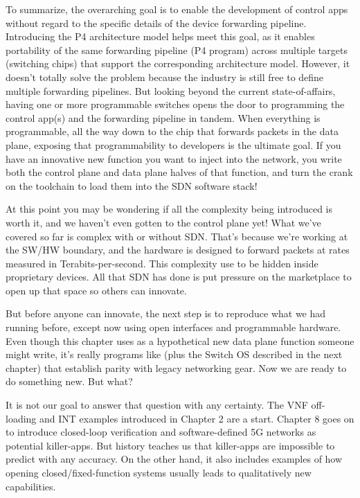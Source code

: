 \documentclass[letterpaper,11pt,english]{sphinxmanual}
\begin{document}
To summarize, the overarching goal is to enable the development of
control apps without regard to the specific details of the device
forwarding pipeline. Introducing the P4 architecture model helps meet
this goal, as it enables portability of the same forwarding pipeline
(P4 program) across multiple targets (switching chips) that support
the corresponding architecture model. However, it doesn’t totally
solve the problem because the industry is still free to define
multiple forwarding pipelines. But looking beyond the current
state-of-affairs, having one or more programmable switches opens the
door to programming the control app(s) and the forwarding pipeline in
tandem. When everything is programmable, all the way down to the chip
that forwards packets in the data plane, exposing that programmability
to developers is the ultimate goal. If you have an innovative new
function you want to inject into the network, you write both the
control plane and data plane halves of that function, and turn the
crank on the toolchain to load them into the SDN software stack!

\begin{sphinxShadowBox}

At this point you may be wondering if all the complexity being
introduced is worth it, and we haven’t even gotten to the
control plane yet! What we’ve covered so far is complex with
or without SDN. That’s because we’re working at the SW/HW
boundary, and the hardware is designed to forward packets at
rates measured in Terabits-per-second. This complexity use to
be hidden inside proprietary devices. All that SDN has done is
put pressure on the marketplace to open up that space so
others can innovate.

But before anyone can innovate, the next step is to reproduce
what we had running before, except now using open interfaces
and programmable hardware. Even though this chapter uses
 as a hypothetical new data plane function
someone might write, it’s really programs like 
(plus the Switch OS described in the next chapter) that
establish parity with legacy networking gear. Now we are ready
to do something new. But what?

It is not our goal to answer that question with any certainty.
The VNF off-loading and INT examples introduced in Chapter 2
are a start. Chapter 8 goes on to introduce closed-loop
verification and software-defined 5G networks as potential
killer-apps. But history teaches us that killer-apps are
impossible to predict with any accuracy. On the other hand, it
also includes  examples of how opening
closed/fixed-function systems usually leads to qualitatively
new capabilities.
\end{sphinxShadowBox}
\end{document}

